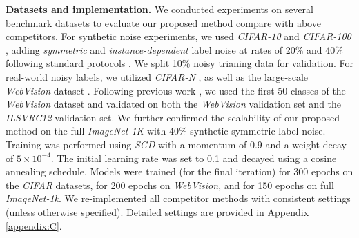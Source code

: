 \textbf{Datasets and implementation.}
We conducted experiments on several benchmark datasets to evaluate our proposed method compare with above competitors. For synthetic noise experiments, we used \emph{CIFAR-10} and \emph{CIFAR-100} \cite{krizhevsky2009learning}, adding \emph{symmetric} and \emph{instance-dependent} label noise at rates of 20\% and 40\% following standard protocols \cite{bai2021me, yuan2023late}. We split 10\% noisy trianing data for validation. For real-world noisy labels, we utilized \emph{CIFAR-N} \cite{wei2021learning}, as well as the large-scale \emph{WebVision} dataset \cite{li2017webvision}. Following previous work \cite{linlearning, li2024regroup}, we used the first 50 classes of the \emph{WebVision} dataset and validated on both the \emph{WebVision} validation set and the \emph{ILSVRC12} \cite{ILSVRC15} validation set. We further confirmed the scalability of our proposed method on the full \emph{ImageNet-1K} \cite{deng2009imagenet} with 40\% synthetic symmetric label noise. Training was performed using \emph{SGD} with a momentum of 0.9 and a weight decay of $5 \times 10^{-4}$. The initial learning rate was set to 0.1 and decayed using a cosine annealing schedule. Models were trained (for the final iteration) for 300 epochs on the \emph{CIFAR} datasets, for 200 epochs on \emph{WebVision}, and for 150 epochs on full \emph{ImageNet-1k}. We re-implemented all competitor methods with consistent settings (unless otherwise specified). Detailed settings are provided in Appendix \ref{appendix:C}.

